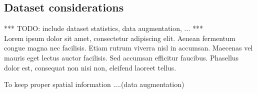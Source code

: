     \subsection{Dataset considerations}
        \par{
            *** TODO: include dataset statistics, data augmentation, ... ***\\
            Lorem ipsum dolor sit amet, consectetur adipiscing elit. Aenean fermentum congue magna nec facilisis. Etiam rutrum viverra nisl in accumsan. Maecenas vel mauris eget lectus auctor facilisis. Sed accumsan efficitur faucibus. Phasellus dolor est, consequat non nisi non, eleifend laoreet tellus.
        }
        \par{
            To keep proper spatial information ....(data augmentation)
        }